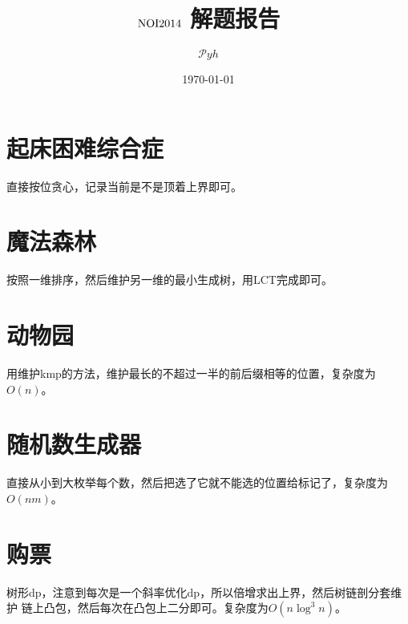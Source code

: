 \documentclass[a4paper]{article}
\date{\today}
\title{$\rm NOI2014$ 解题报告}
\author{$\mathcal Pyh$}
\newcommand{\kai}{\CJKfamily{kai}}
\begin{document}
\maketitle

\kai

\section{起床困难综合症}

直接按位贪心，记录当前是不是顶着上界即可。

\section{魔法森林}

按照一维排序，然后维护另一维的最小生成树，用LCT完成即可。

\section{动物园}

用维护kmp的方法，维护最长的不超过一半的前后缀相等的位置，复杂度为
$O(n)$。

\section{随机数生成器}

直接从小到大枚举每个数，然后把选了它就不能选的位置给标记了，复杂度为
$O(nm)$。

\section{购票}

树形dp，注意到每次是一个斜率优化dp，所以倍增求出上界，然后树链剖分套维护
链上凸包，然后每次在凸包上二分即可。复杂度为$O(n\log ^3n)$。
\end{document}

